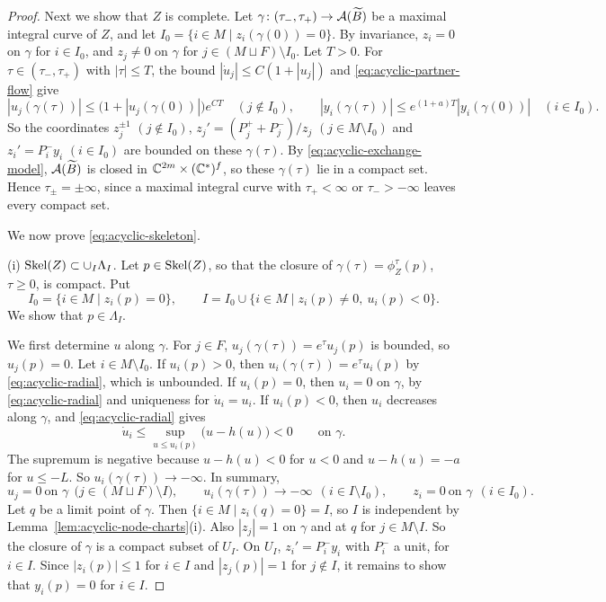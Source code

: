 \documentclass[12pt, letter]{amsart}
\theoremstyle{definition}
\begin{document}
\begin{proof}
Next we show that $Z$ is complete.
Let $\gamma\colon(\tau_-,\tau_+)\to\mathcal{A}(\widetilde B)$ be a maximal integral curve of $Z$, and let $I_0=\{i\in M\mid z_i(\gamma(0))=0\}$.
By invariance, $z_i=0$ on $\gamma$ for $i\in I_0$, and $z_j\ne0$ on $\gamma$ for $j\in(M\sqcup F)\setminus I_0$.
Let $T>0$.
For $\tau\in(\tau_-,\tau_+)$ with $|\tau|\le T$, the bound $|\dot u_j|\le C(1+|u_j|)$ and \eqref{eq:acyclic-partner-flow} give
\[
 |u_j(\gamma(\tau))|\le\bigl(1+|u_j(\gamma(0))|\bigr)e^{CT}\quad(j\notin I_0),\qquad
 |y_i(\gamma(\tau))|\le e^{(1+a)T}|y_i(\gamma(0))|\quad(i\in I_0).
\]
So the coordinates $z_j^{\pm1}$ $(j\notin I_0)$, $z_j'=(P_j^++P_j^-)/z_j$ $(j\in M\setminus I_0)$ and $z_i'=P_i^-y_i$ $(i\in I_0)$ are bounded on these $\gamma(\tau)$.
By \eqref{eq:acyclic-exchange-model}, $\mathcal{A}(\widetilde B)$ is closed in $\mathbb{C}^{2m}\times(\mathbb{C}^*)^f$, so these $\gamma(\tau)$ lie in a compact set.
Hence $\tau_\pm=\pm\infty$, since a maximal integral curve with $\tau_+<\infty$ or $\tau_->-\infty$ leaves every compact set.

We now prove \eqref{eq:acyclic-skeleton}.

(i) \(\operatorname{Skel}(Z) \subset \cup_I \Lambda_I\).
Let $p\in\operatorname{Skel}(Z)$, so that the closure of $\gamma(\tau)=\phi_Z^\tau(p)$, $\tau\ge0$, is compact.
Put
\[
 I_0=\{i\in M\mid z_i(p)=0\},\qquad I=I_0\cup\{i\in M\mid z_i(p)\ne0,\ u_i(p)<0\}.
\]
We show that $p\in\Lambda_I$.

We first determine $u$ along $\gamma$.
For $j\in F$, $u_j(\gamma(\tau))=e^\tau u_j(p)$ is bounded, so $u_j(p)=0$.
Let $i\in M\setminus I_0$.
If $u_i(p)>0$, then $u_i(\gamma(\tau))=e^\tau u_i(p)$ by \eqref{eq:acyclic-radial}, which is unbounded.
If $u_i(p)=0$, then $u_i=0$ on $\gamma$, by \eqref{eq:acyclic-radial} and uniqueness for $\dot u_i=u_i$.
If $u_i(p)<0$, then $u_i$ decreases along $\gamma$, and \eqref{eq:acyclic-radial} gives
\[
 \dot u_i\le\sup_{u\le u_i(p)}\bigl(u-h(u)\bigr)<0\qquad\text{on }\gamma .
\]
The supremum is negative because $u-h(u)<0$ for $u<0$ and $u-h(u)=-a$ for $u\le-L$.
So $u_i(\gamma(\tau))\to-\infty$.
In summary,
\[
 u_j=0\ \text{on }\gamma\ \ \bigl(j\in(M\sqcup F)\setminus I\bigr),\qquad
 u_i(\gamma(\tau))\to-\infty\ \ (i\in I\setminus I_0),\qquad
 z_i=0\ \text{on }\gamma\ \ (i\in I_0).
\]
Let $q$ be a limit point of $\gamma$.
Then $\{i\in M\mid z_i(q)=0\}=I$, so $I$ is independent by Lemma~\ref{lem:acyclic-node-charts}(i).
Also $|z_j|=1$ on $\gamma$ and at $q$ for $j\in M\setminus I$.
So the closure of $\gamma$ is a compact subset of $U_I$.
On $U_I$, $z_i'=P_i^-y_i$ with $P_i^-$ a unit, for $i\in I$.
Since $|z_i(p)|\le1$ for $i\in I$ and $|z_j(p)|=1$ for $j\notin I$, it remains to show that $y_i(p)=0$ for $i\in I$.


\end{proof}
\end{document}
